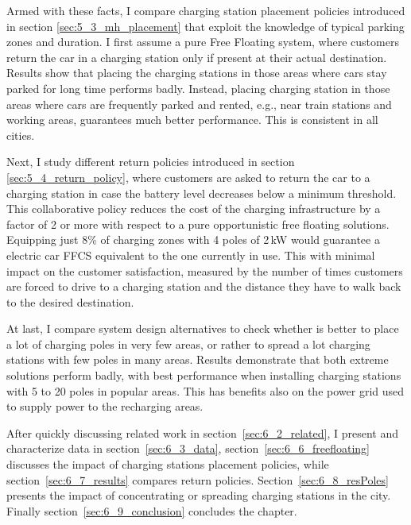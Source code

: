 Armed with these facts, I compare charging station placement policies introduced in section \ref{sec:5_3_mh_placement} that exploit the knowledge of typical parking zones and duration. I first assume a pure Free Floating system, where customers return the car in a charging station only if present at their actual destination.
Results show that placing the charging stations in those areas where cars stay parked for long time performs badly. Instead, placing charging station in those areas where cars are frequently parked and rented, e.g., near train stations and working areas, guarantees much better performance. This is consistent in all cities.

Next, I study different return policies introduced in section \ref{sec:5_4_return_policy}, where customers are asked to return the car to a charging station in case the battery level decreases below a minimum threshold. This collaborative policy reduces the cost of the charging infrastructure by a factor of 2 or more with respect to a pure opportunistic free floating solutions. Equipping just 8\% of charging zones with 4 poles of 2\,kW would guarantee a electric car FFCS equivalent to the one currently in use.
This with minimal impact on the customer satisfaction, measured by the number of times customers are forced to drive to a charging station and the distance they have to walk back to the desired destination.

At last, I compare system design alternatives to check whether is better to place a lot of charging poles in very few areas, or rather to spread a lot charging stations with few poles in many areas. Results demonstrate that both extreme solutions perform badly, with best performance when installing charging stations with  5 to 20 poles in popular areas. This has benefits also on the power grid used to supply power to the recharging areas.


After quickly discussing related work in section~\ref{sec:6_2_related}, I present and characterize data in section~\ref{sec:6_3_data}, 
section~\ref{sec:6_6_freefloating} discusses the impact of charging stations placement policies, while section~\ref{sec:6_7_results} compares return policies. Section~\ref{sec:6_8_resPoles} presents the impact of concentrating or spreading charging stations in the city. Finally section~\ref{sec:6_9_conclusion} concludes the chapter.
